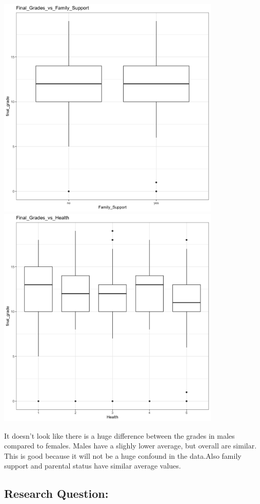 \documentclass[]{article}
\begin{document}
\includegraphics[width=0.8\textwidth,height=\textheight]{images/Final_Grade_vs_Family_Support.png}
\includegraphics[width=0.8\textwidth,height=\textheight]{images/Final_Grade_vs_Health.png}

It doesn't look like there is a huge difference between the grades in
males compared to females. Males have a slighly lower average, but
overall are similar. This is good because it will not be a huge confound
in the data.Also family support and parental status have similar average
values.

\hypertarget{research-question}{%
\subsection{Research Question:}\label{research-question}}
\end{document}
